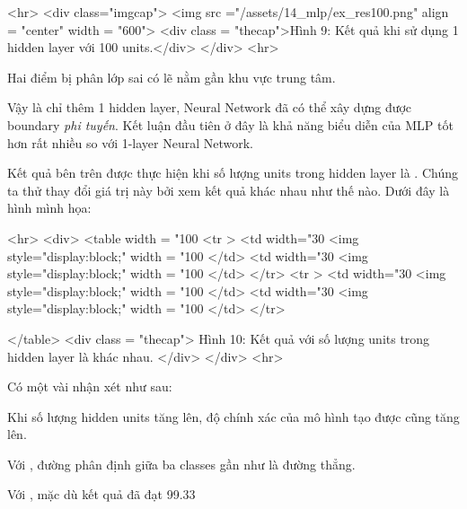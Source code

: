 <hr> 
<div class="imgcap"> 
 <img src ="/assets/14_mlp/ex_res100.png" align = "center" width = "600"> 
 <div class = "thecap">Hình 9: Kết quả khi sử dụng 1 hidden layer với 100 units.</div> 
</div> 
<hr> 
 
Hai điểm bị phân lớp sai có lẽ nằm gần khu vực trung tâm. 
 
Vậy là chỉ thêm 1 hidden layer, Neural Network đã có thể xây dựng được boundary \textit{phi tuyến}. Kết luận đầu tiên ở đây là khả năng biểu diễn của MLP tốt hơn rất nhiều so với 1-layer Neural Network. 
 
 
 
Kết quả bên trên được thực hiện khi số lượng units trong hidden layer là . Chúng ta thử thay đổi giá trị này bởi  xem kết quả khác nhau như thế nào. Dưới đây là hình mình họa: 
 
<hr> 
<div> 
<table width = "100%
   <tr > 
        <td width="30%
        <img style="display:block;" width = "100%
         </td> 
        <td width="30%
        <img style="display:block;" width = "100%
        </td> 
    </tr> 
    <tr > 
         <td width="30%
         <img style="display:block;" width = "100%
          </td> 
         <td width="30%
         <img style="display:block;" width = "100%
         </td> 
     </tr> 
 
</table> 
<div class = "thecap"> Hình 10: Kết quả với số lượng units trong hidden layer là khác nhau. </div> 
</div> 
<hr> 
 
Có một vài nhận xét như sau: 
 
\item Khi số lượng hidden units tăng lên, độ chính xác của mô hình tạo được cũng tăng lên. 
 
\item Với , đường phân định giữa ba classes gần như là đường thẳng. 
 
\item Với , mặc dù kết quả đã đạt 99.33%
 
